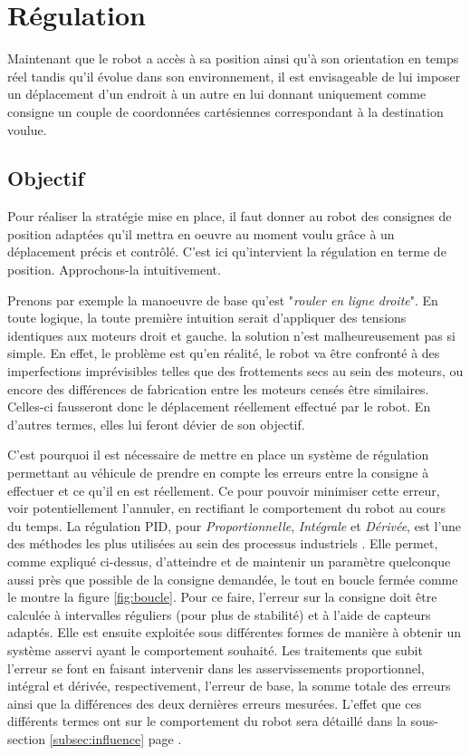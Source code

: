\documentclass[a4paper,11pt]{article}
\begin{document}
\section{\label{sec:reg}Régulation}

Maintenant que le robot a accès à sa position ainsi qu'à son orientation en temps réel tandis qu'il évolue dans son environnement, il est envisageable de lui imposer un déplacement d'un endroit à un autre en lui donnant uniquement comme consigne un couple de coordonnées cartésiennes correspondant à la destination voulue.

\subsection{Objectif}

Pour réaliser la stratégie mise en place, il faut donner au robot des consignes de position adaptées qu'il mettra en oeuvre au moment voulu grâce à un déplacement précis et contrôlé. C'est ici qu'intervient la régulation en terme de position. Approchons-la intuitivement.

Prenons par exemple la manoeuvre de base qu'est "\textit{rouler en ligne droite}". En toute logique, la toute première intuition serait d'appliquer des tensions identiques aux moteurs droit et gauche. la solution n'est malheureusement pas si simple. En effet, le problème est qu'en réalité, le robot va être confronté à des imperfections imprévisibles telles que des frottements secs au sein des moteurs, ou encore des différences de fabrication entre les moteurs censés être similaires. Celles-ci fausseront donc le déplacement réellement effectué par le robot. En d'autres termes, elles lui feront dévier de son objectif.

C'est pourquoi il est nécessaire de mettre en place un système de régulation permettant au véhicule de prendre en compte les erreurs entre la consigne à effectuer et ce qu'il en est réellement. Ce pour pouvoir minimiser cette erreur, voir potentiellement l'annuler, en rectifiant le comportement du robot au cours du temps. La régulation PID, pour \textit{Proportionnelle}, \textit{Intégrale} et \textit{Dérivée}, est l'une des méthodes les plus utilisées au sein des processus industriels \cite{le_lann_pid_2007}. Elle permet, comme expliqué ci-dessus, d'atteindre et de maintenir un paramètre quelconque aussi près que possible de la consigne demandée, le tout en boucle fermée comme le montre la figure \ref{fig:boucle}. Pour ce faire, l'erreur sur la consigne doit être calculée à intervalles réguliers (pour plus de stabilité) et à l'aide de capteurs adaptés. Elle est ensuite exploitée sous différentes formes de manière à obtenir un système asservi ayant le comportement souhaité. Les traitements que subit l'erreur se font en faisant intervenir dans les asservissements proportionnel, intégral et dérivée, respectivement, l'erreur de base, la somme totale des erreurs ainsi que la différences des deux dernières erreurs mesurées. L'effet que ces différents termes ont sur le comportement du robot sera détaillé dans la sous-section \ref{subsec:influence} page \pageref{subsec:influence}.
\end{document}
